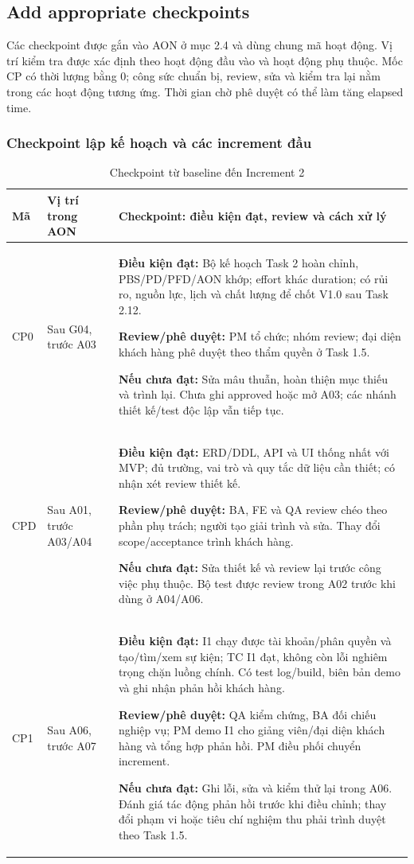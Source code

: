 \clearpage
\subsection{Add appropriate checkpoints}
Các checkpoint được gắn vào AON ở mục 2.4 và dùng chung mã hoạt động. Vị trí kiểm tra được xác định theo hoạt động đầu vào và hoạt động phụ thuộc. Mốc CP có thời lượng bằng 0; công sức chuẩn bị, review, sửa và kiểm tra lại nằm trong các hoạt động tương ứng. Thời gian chờ phê duyệt có thể làm tăng elapsed time.
\subsubsection{Checkpoint lập kế hoạch và các increment đầu}
\begin{table}[H]
\centering
\caption{Checkpoint từ baseline đến Increment 2}
\footnotesize
\renewcommand{\arraystretch}{1.15}
\begin{tabularx}{\linewidth}{|p{0.9cm}|p{2.5cm}|>{\raggedright\arraybackslash}X|}
\hline
\textbf{Mã} & \textbf{Vị trí trong AON} & \textbf{Checkpoint: điều kiện đạt, review và cách xử lý} \\ \hline
CP0 & Sau G04, trước A03 & \textbf{Điều kiện đạt:} Bộ kế hoạch Task 2 hoàn chỉnh, PBS/PD/PFD/AON khớp; effort khác duration; có rủi ro, nguồn lực, lịch và chất lượng để chốt V1.0 sau Task 2.12. \par \textbf{Review/phê duyệt:} PM tổ chức; nhóm review; đại diện khách hàng phê duyệt theo thẩm quyền ở Task 1.5. \par \textbf{Nếu chưa đạt:} Sửa mâu thuẫn, hoàn thiện mục thiếu và trình lại. Chưa ghi approved hoặc mở A03; các nhánh thiết kế/test độc lập vẫn tiếp tục. \\ \hline
CPD & Sau A01, trước A03/A04 & \textbf{Điều kiện đạt:} ERD/DDL, API và UI thống nhất với MVP; đủ trường, vai trò và quy tắc dữ liệu cần thiết; có nhận xét review thiết kế. \par \textbf{Review/phê duyệt:} BA, FE và QA review chéo theo phần phụ trách; người tạo giải trình và sửa. Thay đổi scope/acceptance trình khách hàng. \par \textbf{Nếu chưa đạt:} Sửa thiết kế và review lại trước công việc phụ thuộc. Bộ test được review trong A02 trước khi dùng ở A04/A06. \\ \hline
CP1 & Sau A06, trước A07 & \textbf{Điều kiện đạt:} I1 chạy được tài khoản/phân quyền và tạo/tìm/xem sự kiện; TC I1 đạt, không còn lỗi nghiêm trọng chặn luồng chính. Có test log/build, biên bản demo và ghi nhận phản hồi khách hàng. \par \textbf{Review/phê duyệt:} QA kiểm chứng, BA đối chiếu nghiệp vụ; PM demo I1 cho giảng viên/đại diện khách hàng và tổng hợp phản hồi. PM điều phối chuyển increment. \par \textbf{Nếu chưa đạt:} Ghi lỗi, sửa và kiểm thử lại trong A06. Đánh giá tác động phản hồi trước khi điều chỉnh; thay đổi phạm vi hoặc tiêu chí nghiệm thu phải trình duyệt theo Task 1.5. \\ \hline

\end{tabularx}
\end{table}
